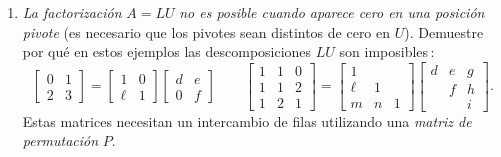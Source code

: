 \documentclass[12pt,a4paper]{article}
\newcommand\1{\mbox{\,\vrule height-0.8pt depth1.0pt width2pc\,}}
\newcommand\2{\mbox{\,\vrule height-0.8pt depth1.0pt width1pc\,}}
\begin{document}
\begin{enumerate}

\item \emph{La factorización} $A=LU$ \emph{no es posible cuando aparece cero en una posición pivote} (es necesario que los pivotes sean distintos de cero en $U$). Demuestre por qué en estos ejemplos las descomposiciones $LU$ son imposibles\,: %
%
\begin{displaymath}
  \begin{bmatrix} 0 & 1\\ 2 & 3\end{bmatrix}=
  \begin{bmatrix} 1 & 0\\ \ell & 1\end{bmatrix}
  \begin{bmatrix} d & e\\ 0 & f\end{bmatrix}
  \qquad\begin{bmatrix} 1 & 1 & 0\\ 1 & 1 & 2\\
    1 & 2 & 1\end{bmatrix}=\begin{bmatrix} 1\\
    \ell & 1\\ m & n & 1\end{bmatrix}
  \begin{bmatrix} d & e & g\\
    & f & h\\ && i\end{bmatrix}.
\end{displaymath}
Estas matrices necesitan un intercambio de filas utilizando una \emph{matriz de permutación} $P$.




\end{enumerate}
\end{document}
